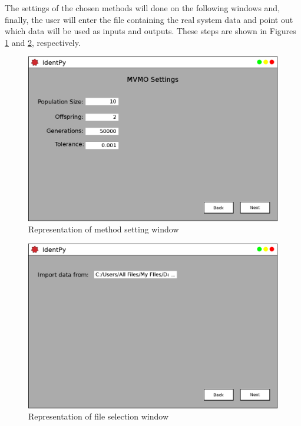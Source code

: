 The settings of the chosen methods will done on the following windows and, finally, the user will enter the file containing the real system data and point out which data will be used as inputs and outputs. These steps are shown in Figures \ref{fig: pg3} and \ref{fig: pg4}, respectively.

\begin{figure}[h]
	\caption{Representation of method setting window}
	\begin{center}
		\includegraphics[scale=.5]{Images/Software_pg3.eps}
	\end{center}
	\label{fig: pg3}
\end{figure}

\begin{figure}[h]
	\caption{Representation of file selection window}
	\begin{center}
		\includegraphics[scale=.5]{Images/Software_pg4.eps}
	\end{center}
	\label{fig: pg4}
\end{figure}

